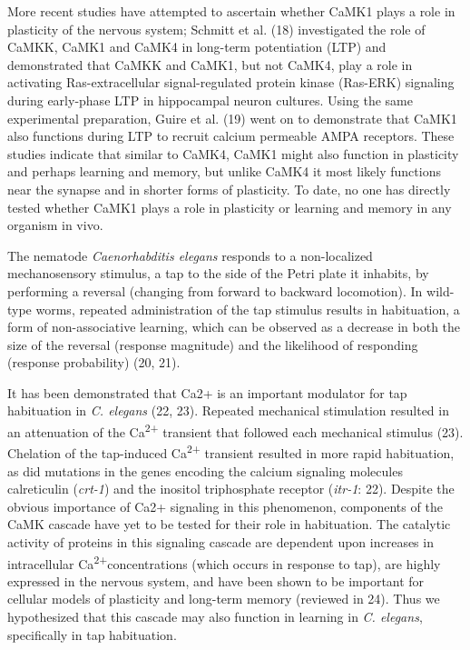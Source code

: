 \documentclass[9pt,twocolumn,twoside]{gsajnl}
\begin{document}
	More recent studies have attempted to ascertain whether CaMK1 plays a role in plasticity of the nervous system; Schmitt et al. (18) investigated the role of CaMKK, CaMK1 and CaMK4 in long-term potentiation (LTP) and demonstrated that CaMKK and CaMK1, but not CaMK4, play a role in activating Ras-extracellular signal-regulated protein kinase (Ras-ERK) signaling during early-phase LTP in hippocampal neuron cultures. Using the same experimental preparation, Guire et al. (19) went on to demonstrate that CaMK1 also functions during LTP to recruit calcium permeable AMPA receptors. These studies indicate that similar to CaMK4, CaMK1 might also function in plasticity and perhaps learning and memory, but unlike CaMK4 it most likely functions near the synapse and in shorter forms of plasticity. To date, no one has directly tested whether CaMK1 plays a role in plasticity or learning and memory in any organism in vivo.
	
	The nematode \textit{Caenorhabditis elegans} responds to a non-localized mechanosensory stimulus, a tap to the side of the Petri plate it inhabits, by performing a reversal (changing from forward to backward locomotion). In wild-type worms, repeated administration of the tap stimulus results in habituation, a form of non-associative learning, which can be observed as a decrease in both the size of the reversal (response magnitude) and the likelihood of responding (response probability) (20, 21). 
	
	It has been demonstrated that Ca2+ is an important modulator for tap habituation in \textit{C. elegans} (22, 23). Repeated mechanical stimulation resulted in an attenuation of the Ca\textsuperscript{2+} transient that followed each mechanical stimulus (23). Chelation of the tap-induced Ca\textsuperscript{2+} transient resulted in more rapid habituation, as did mutations in the genes encoding the calcium signaling molecules calreticulin (\textit{crt-1}) and the inositol triphosphate receptor (\textit{itr-1}: 22). Despite the obvious importance of Ca2+ signaling in this phenomenon, components of the CaMK cascade have yet to be tested for their role in habituation. The catalytic activity of proteins in this signaling cascade are dependent upon increases in intracellular Ca\textsuperscript{2+}concentrations (which occurs in response to tap), are highly expressed in the nervous system, and have been shown to be important for cellular models of plasticity and long-term memory (reviewed in 24). Thus we hypothesized that this cascade may also function in learning in \textit{C. elegans}, specifically in tap habituation. 
	
\end{document}
